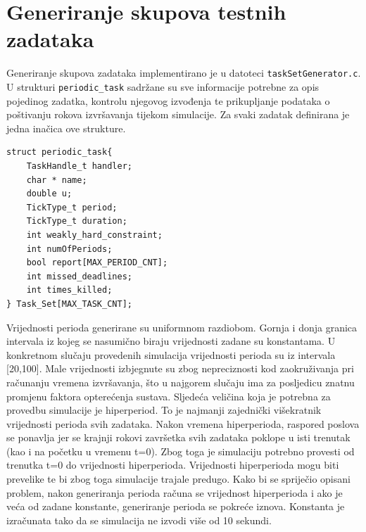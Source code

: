 \documentclass[../zavrsni.tex]{subfiles}
\begin{document}
\sloppy

\justifying

\section{Generiranje skupova testnih zadataka}




Generiranje skupova zadataka implementirano je u datoteci \texttt{taskSetGenerator.c}. U strukturi \texttt{periodic\_task} sadržane su sve 
informacije potrebne za opis pojedinog zadatka, kontrolu njegovog izvođenja te prikupljanje podataka o poštivanju rokova 
izvršavanja tijekom simulacije. Za svaki zadatak definirana je jedna inačica ove strukture. 
\begin{lstlisting}[style=CStyle,caption={Struktura \texttt{periodic\_task}},captionpos=b]
struct periodic_task{
    TaskHandle_t handler;
    char * name;
    double u;
    TickType_t period;
    TickType_t duration;
    int weakly_hard_constraint;
    int numOfPeriods;
    bool report[MAX_PERIOD_CNT];
    int missed_deadlines;
    int times_killed;
} Task_Set[MAX_TASK_CNT];
\end{lstlisting}

Vrijednosti perioda generirane su uniformnom razdiobom. Gornja i donja granica intervala iz kojeg se nasumično biraju vrijednosti zadane su konstantama.
U konkretnom slučaju provedenih simulacija vrijednosti perioda su iz intervala [20,100]. Male vrijednosti izbjegnute su zbog nepreciznosti kod zaokruživanja pri
računanju vremena izvršavanja, što u najgorem slučaju ima za posljedicu znatnu promjenu faktora opterećenja sustava. 
Sljedeća veličina koja je potrebna za 
provedbu simulacije je hiperperiod. To je najmanji zajednički višekratnik vrijednosti perioda svih zadataka. Nakon vremena hiperperioda, raspored poslova 
se ponavlja jer se krajnji rokovi završetka svih zadataka poklope u isti trenutak (kao i na početku u vremenu t=0). Zbog toga je simulaciju potrebno provesti od trenutka t=0 do vrijednosti hiperperioda. 
Vrijednosti hiperperioda mogu biti prevelike te 
bi zbog toga simulacije trajale predugo. Kako bi se spriječio opisani problem, nakon generiranja perioda računa se vrijednost hiperperioda i ako je veća od zadane konstante,
 generiranje perioda se pokreće iznova. Konstanta je izračunata tako da se simulacija ne izvodi više od 10 sekundi.
\end{document}
